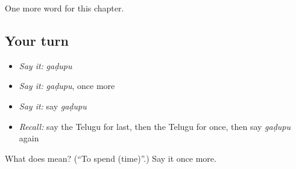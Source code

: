 \begin{grammarlens}[title={What you've built}]
One more word for this chapter.
\end{grammarlens}

\subsection*{Your turn}
\begin{itemize}
\raggedright
  \item \emph{Say it:} \emph{gaḍupu}
  \item \emph{Say it:} \emph{gaḍupu}, once more
  \item \emph{Say it:} say \emph{gaḍupu}
  \item \emph{Recall:} say the Telugu for last, then the Telugu for once, then say \emph{gaḍupu} again
\end{itemize}

\begin{tcolorbox}[breakable,colback=teal!4,colframe=teal!35!black,title={Before you move on}]
What does  mean? (\textquotedblleft{}To spend (time)\textquotedblright{}.) Say it once more.
\end{tcolorbox}
